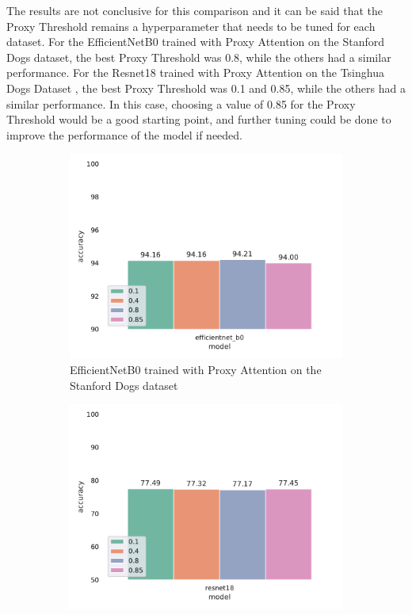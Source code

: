 \documentclass[a4paper,11pt,openright]{book}
\begin{document}
The results are not conclusive for this comparison and it can be said that the Proxy Threshold remains a hyperparameter that needs to be tuned for each dataset.
For the EfficientNetB0 \cite{tanEfficientnetRethinkingModel2019} trained with Proxy Attention on the Stanford Dogs dataset\cite{khoslaNovelDatasetFineGrained}, the best Proxy Threshold was 0.8, while the others had a similar performance. For the Resnet18 \cite{heDeepResidualLearning2016} trained with Proxy Attention on the Tsinghua Dogs Dataset \cite{zouNewDatasetDog2020}, the best Proxy Threshold was 0.1 and 0.85, while the others had a similar performance.
In this case, choosing a value of 0.85 for the Proxy Threshold would be a good starting point, and further tuning could be done to improve the performance of the model if needed.

\begin{figure}[!htb]
    \begin{subfigure}[h]{.5\textwidth}
        \includegraphics[width=\linewidth, right]{results/proxy_threshold_results.pdf}
        \caption{EfficientNetB0 \cite{tanEfficientnetRethinkingModel2019} trained with Proxy Attention on the Stanford Dogs dataset\cite{khoslaNovelDatasetFineGrained}}
    \end{subfigure}
    \begin{subfigure}[h]{.5\textwidth}
        \includegraphics[width=\linewidth, left]{results/proxy_threshold_results_tsing.pdf}

\end{subfigure}
\end{figure}
\end{document}
